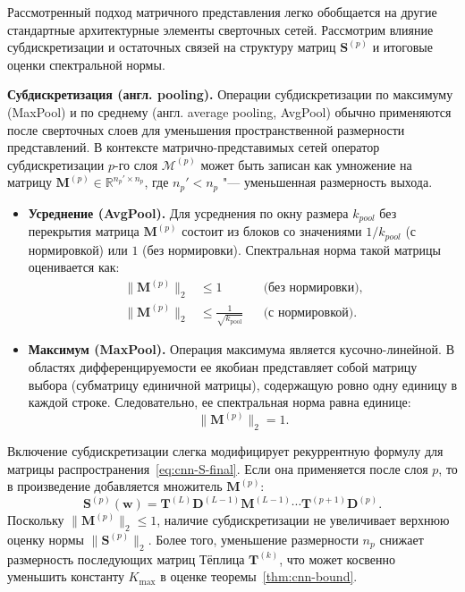 Рассмотренный подход матричного представления легко обобщается на другие стандартные архитектурные элементы сверточных сетей. Рассмотрим влияние субдискретизации и остаточных связей на структуру матриц $\mathbf{S}^{(p)}$ и итоговые оценки спектральной нормы.

\textbf{Субдискретизация (англ. pooling).} Операции субдискретизации по максимуму (MaxPool) и по среднему (англ. average pooling, AvgPool) обычно применяются после сверточных слоев для уменьшения пространственной размерности представлений. В контексте матрично-представимых сетей оператор субдискретизации $p$-го слоя $\mathcal{M}^{(p)}$ может быть записан как умножение на матрицу $\mathbf{M}^{(p)} \in \mathbb{R}^{n_{p}' \times n_p}$, где $n_{p}' < n_p$ "--- уменьшенная размерность выхода.

\begin{itemize}
    \item \textbf{Усреднение (AvgPool).} Для усреднения по окну размера $k_{pool}$ без перекрытия матрица $\mathbf{M}^{(p)}$ состоит из блоков со значениями $1/k_{pool}$ (с нормировкой) или $1$ (без нормировки). Спектральная норма такой матрицы оценивается как:
    \begin{align}
        \|\mathbf{M}^{(p)}\|_2 &\leqslant 1
        && \text{(без нормировки)},
        \\
        \|\mathbf{M}^{(p)}\|_2
        &\leqslant \frac{1}{\sqrt{k_{\text{pool}}}}
        && \text{(с нормировкой)}.
    \end{align}
    \item \textbf{Максимум (MaxPool).} Операция максимума является кусочно-линейной. В областях дифференцируемости ее якобиан представляет собой матрицу выбора (субматрицу единичной матрицы), содержащую ровно одну единицу в каждой строке. Следовательно, ее спектральная норма равна единице:
    \begin{equation}
        \|\mathbf{M}^{(p)}\|_2 = 1.
    \end{equation}
\end{itemize}

Включение субдискретизации слегка модифицирует рекуррентную формулу для матрицы распространения~\eqref{eq:cnn-S-final}. Если она применяется после слоя $p$, то в произведение добавляется множитель $\mathbf{M}^{(p)}$:
\begin{equation}
    \mathbf{S}^{(p)}(\mathbf{w}) = \mathbf{T}^{(L)} \mathbf{D}^{(L-1)} \mathbf{M}^{(L-1)} \cdots \mathbf{T}^{(p+1)} \mathbf{D}^{(p)}.
\end{equation}
Поскольку $\|\mathbf{M}^{(p)}\|_2 \leqslant 1$, наличие субдискретизации не увеличивает верхнюю оценку нормы $\|\mathbf{S}^{(p)}\|_2$. Более того, уменьшение размерности $n_p$ снижает размерность последующих матриц Тёплица $\mathbf{T}^{(k)}$, что может косвенно уменьшить константу $K_{\text{max}}$ в оценке теоремы~\ref{thm:cnn-bound}.

